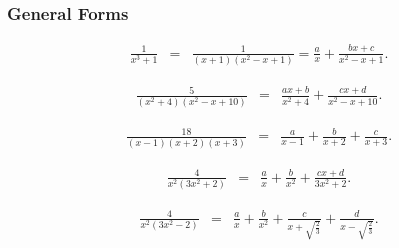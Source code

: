 \begin{frame}
  \frametitle{General Forms}

  \begin{eqnarray*}
    \frac{1}{x^3+1} & = & \frac{1}{(x+1)(x^2-x+1)}= \frac{a}{x} + \frac{bx+c}{x^2-x+1}.
  \end{eqnarray*}

  \begin{eqnarray*}
    \frac{5}{(x^2+4)(x^2-x+10)} & = & \frac{ax+b}{x^2+4} + \frac{cx+d}{x^2-x+10}.
  \end{eqnarray*}

  \begin{eqnarray*}
    \frac{18}{(x-1)(x+2)(x+3)} & = & \frac{a}{x-1} + \frac{b}{x+2} + \frac{c}{x+3}.
  \end{eqnarray*}


  \begin{eqnarray*}
    \frac{4}{x^2(3x^2+2)} & = & \frac{a}{x} + \frac{b}{x^2} + \frac{cx+d}{3x^2+2}.
  \end{eqnarray*}

  \begin{eqnarray*}
    \frac{4}{x^2(3x^2-2)} & = & \frac{a}{x} + \frac{b}{x^2} + \frac{c}{x+\sqrt{\frac{2}{3}}} + \frac{d}{x-\sqrt{\frac{2}{3}}}.
  \end{eqnarray*}

  
\end{frame}



